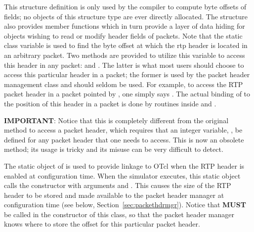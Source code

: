 This structure definition is only used by the
compiler to compute byte offsets of fields;
no objects of this structure type are ever directly allocated.
The structure also provides member functions which in turn
provide a layer of data hiding for objects wishing to read
or modify header fields of packets.
Note that the static class variable  is used
to find the byte offset at which the rtp header is located
in an arbitrary \ns packet.
Two methods are provided to utilize this variable to access this
header in any packet:  and .
The latter is what most users should choose to access this particular
header in a packet; the former is used by the packet header management
class and should seldom be used.
For example, to access the RTP packet header in a packet pointed by
, one simply says .
The actual binding of  to the position of this header in
a packet is done by routines inside  and
.

{\bf IMPORTANT}: Notice that this is completely different from the
original method to access a packet header, which requires that an
integer variable, , be defined for any packet
header that one needs to access.
This is now an obsolete method; its usage is tricky and its misuse can
be very difficult to detect. 


The static object  of
is used to provide linkage to OTcl when the RTP header is
enabled at configuration time.
When the simulator executes, this static object calls
the  constructor with arguments
 and .
This causes the size of the RTP header to be stored
and made available to the packet header manager
at configuration time (see below, Section~\ref{sec:packethdrmgr}).
Notice that  {\bf MUST} be called in the 
constructor of this class, so that the packet
header manager knows where to store the offset for this particular
packet header. 

